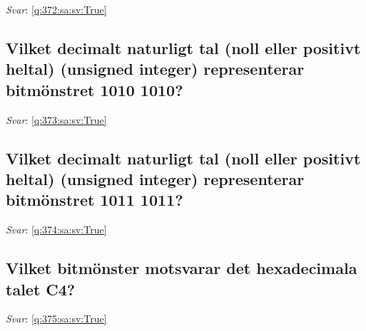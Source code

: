 \documentclass[a4paper,11pt,oneside]{article}
\begin{document}
\begin{sloppypar}
\vspace{2cm}

\noindent\makebox[\textwidth]{\hrulefill}

\vspace{1cm}

\textit{Svar}: \autoref{q:372:sa:sv:True}



\subsection{Vilket decimalt naturligt tal (noll eller positivt heltal) (unsigned integer) representerar bitm\"onstret 1010 1010?}

\label{q:373:sa:sv:False}

\vspace{2cm}

\noindent\makebox[\textwidth]{\hrulefill}

\vspace{1cm}

\textit{Svar}: \autoref{q:373:sa:sv:True}



\subsection{Vilket decimalt naturligt tal (noll eller positivt heltal) (unsigned integer) representerar bitm\"onstret 1011 1011?}

\label{q:374:sa:sv:False}

\vspace{2cm}

\noindent\makebox[\textwidth]{\hrulefill}

\vspace{1cm}

\textit{Svar}: \autoref{q:374:sa:sv:True}



\subsection{Vilket bitm\"onster motsvarar det hexadecimala talet C4?}

\label{q:375:sa:sv:False}

\vspace{2cm}

\noindent\makebox[\textwidth]{\hrulefill}

\vspace{1cm}

\textit{Svar}: \autoref{q:375:sa:sv:True}




\end{sloppypar}
\end{document}
